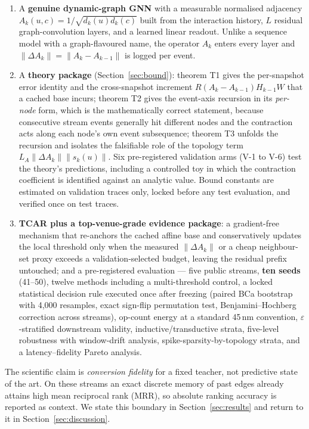 \documentclass[preprint,12pt]{elsarticle}
\begin{document}
\begin{enumerate}
\item A \textbf{genuine dynamic-graph GNN} with a measurable normalised adjacency $A_k(u,c)=1/\sqrt{d_k(u)d_k(c)}$ built from the interaction history, $L$ residual graph-convolution layers, and a learned linear readout. Unlike a sequence model with a graph-flavoured name, the operator $A_k$ enters every layer and $\|\Delta A_k\|=\|A_k-A_{k-1}\|$ is logged per event.
\item A \textbf{theory package} (Section~\ref{sec:bound}): theorem T1 gives the per-snapshot error identity and the cross-snapshot increment $R(A_k-A_{k-1})H_{k-1}W$ that a cached base incurs; theorem T2 gives the event-axis recursion in its \emph{per-node} form, which is the mathematically correct statement, because consecutive stream events generally hit different nodes and the contraction acts along each node's own event subsequence; theorem T3 unfolds the recursion and isolates the falsifiable role of the topology term $L_A\|\Delta A_k\|\|s_k(u)\|$. Six pre-registered validation arms (V-1 to V-6) test the theory's predictions, including a controlled toy in which the contraction coefficient is identified against an analytic value. Bound constants are estimated on validation traces only, locked before any test evaluation, and verified once on test traces.
\item \textbf{TCAR plus a top-venue-grade evidence package}: a gradient-free mechanism that re-anchors the cached affine base and conservatively updates the local threshold only when the measured $\|\Delta A_k\|$ or a cheap neighbour-set proxy exceeds a validation-selected budget, leaving the residual prefix untouched; and a pre-registered evaluation --- five public streams, \textbf{ten seeds} (41--50), twelve methods including a multi-threshold control, a locked statistical decision rule executed once after freezing (paired BCa bootstrap with 4{,}000 resamples, exact sign-flip permutation test, Benjamini--Hochberg correction across streams), op-count energy at a standard 45\,nm convention, $\varepsilon$-stratified downstream validity, inductive/transductive strata, five-level robustness with window-drift analysis, spike-sparsity-by-topology strata, and a latency--fidelity Pareto analysis.
\end{enumerate}

The scientific claim is \emph{conversion fidelity} for a fixed teacher, not predictive state of the art. On these streams an exact discrete memory of past edges already attains high mean reciprocal rank (MRR), so absolute ranking accuracy is reported as context. We state this boundary in Section~\ref{sec:results} and return to it in Section~\ref{sec:discussion}.
\end{document}
